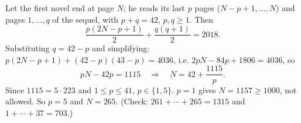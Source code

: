 Let the first novel end at page $N$; he reads its last $p$ pages ($N-p+1,\dots,N$) and pages $1,\dots,q$ of the sequel, with $p+q=42$, $p,q\ge1$. Then
\[\dfrac{p(2N-p+1)}2+\dfrac{q(q+1)}2=2018.\]
Substituting $q=42-p$ and simplifying: $p(2N-p+1)+(42-p)(43-p)=4036$, i.e. $2pN-84p+1806=4036$, so
\[pN-42p=1115\quad\Longrightarrow\quad N=42+\dfrac{1115}{p}.\]
Since $1115=5\cdot223$ and $1\le p\le41$, $p\in\{1,5\}$. $p=1$ gives $N=1157\ge1000$, not allowed. So $p=5$ and $N=\boxed{265}$. (Check: $261+\cdots+265=1315$ and $1+\cdots+37=703$.)
